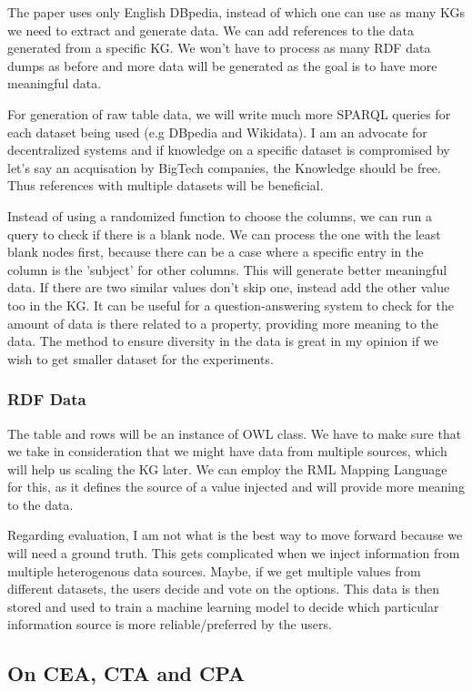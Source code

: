 \documentclass[runningheads]{llncs}
\begin{document}
The paper uses only English DBpedia, instead of which one can use as many KGs we need to extract and generate data. We can add references to the data generated
from a specific KG. We won't have to process as many RDF data dumps as before and more data will be generated as the goal is to have more meaningful
data.

For generation of raw table data, we will write much more SPARQL queries for each dataset being used (e.g DBpedia and Wikidata). I am an advocate for 
decentralized systems and if knowledge on a specific dataset is compromised by let's say an acquisation by BigTech companies, the Knowledge should be free.
Thus references with multiple datasets will be beneficial.

Instead of using a randomized function to choose the columns, we can run a query to check if there is a blank node. We can process the one with the least blank nodes first,
because there can be a case where a specific entry in the column is the 'subject' for other columns. This will generate better meaningful data.
If there are two similar values don't skip one, instead add the other value too in the KG. It can be useful for a question-answering system to 
check for the amount of data is there related to a property, providing more meaning to the data. The method to ensure diversity in the data is great in my opinion if we wish to get smaller dataset for the experiments.

\subsubsection*{RDF Data}
The table and rows will be an instance of OWL class. We have to make sure that we take in consideration that we might have data from multiple sources,
which will help us scaling the KG later. We can employ the RML Mapping Language for this, as it defines the source of a value injected and will
provide more meaning to the data.

Regarding evaluation, I am not what is the best way to move forward because we will need a ground truth. This gets complicated when we inject information from multiple heterogenous data sources.
Maybe, if we get multiple values from different datasets, the users decide and vote on the options. This data is then stored and used to train a 
machine learning model to decide which particular information source is more reliable/preferred by the users.

\subsection{On CEA, CTA and CPA}
\end{document}
